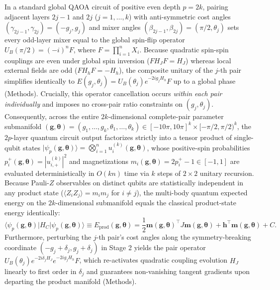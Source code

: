 \documentclass[10pt,a4paper]{article}
\begin{document}
In a standard global QAOA circuit of positive even depth $p = 2k$, pairing adjacent layers $2j-1$ and $2j$ ($j = 1, \ldots, k$) with anti-symmetric cost angles $(\gamma_{2j-1}, \gamma_{2j}) = (-g_j, g_j)$ and mixer angles $(\beta_{2j-1}, \beta_{2j}) = (\pi/2, \theta_j)$ sets every odd-layer mixer equal to the global spin-flip operator $U_B(\pi/2) = (-i)^n F$, where $F = \prod_{i=1}^n X_i$. Because quadratic spin-spin couplings are even under global spin inversion ($F H_J F = H_J$) whereas local external fields are odd ($F H_h F = -H_h$), the composite unitary of the $j$-th pair simplifies identically to $E(g_j, \theta_j) = U_B(\theta_j) e^{-2i g_j H_h} F$ up to a global phase \citep{yao2026echo} (Methods). Crucially, this operator cancellation occurs \emph{within each pair individually} and imposes no cross-pair ratio constraints on $(g_j, \theta_j)$. Consequently, across the entire $2k$-dimensional complete-pair parameter submanifold $(\boldsymbol{g}, \boldsymbol{\theta}) = (g_1, \ldots, g_k, \theta_1, \ldots, \theta_k) \in [-10\pi, 10\pi]^k \times [-\pi/2, \pi/2)^k$, the $2p$-layer quantum circuit output factorizes strictly into a tensor product of single-qubit states $|\psi_p(\boldsymbol{g}, \boldsymbol{\theta})\rangle = \bigotimes_{i=1}^n u_i^{(k)}(\boldsymbol{g}, \boldsymbol{\theta})$, whose positive-spin probabilities $p_i^+(\boldsymbol{g}, \boldsymbol{\theta}) = |u_{i,+}^{(k)}|^2$ and magnetizations $m_i(\boldsymbol{g}, \boldsymbol{\theta}) = 2p_i^+ - 1 \in [-1, 1]$ are evaluated deterministically in $O(kn)$ time via $k$ steps of $2\times 2$ unitary recursion. Because Pauli-$Z$ observables on distinct qubits are statistically independent in any product state ($\langle Z_i Z_j \rangle = m_i m_j$ for $i \ne j$), the multi-body quantum expected energy on the $2k$-dimensional submanifold equals the classical product-state energy identically:
\[
\langle\psi_p(\boldsymbol{g},\boldsymbol{\theta})|H_C|\psi_p(\boldsymbol{g},\boldsymbol{\theta})\rangle \equiv E_{\mathrm{prod}}(\boldsymbol{g},\boldsymbol{\theta}) = \frac{1}{2}\boldsymbol{m}(\boldsymbol{g},\boldsymbol{\theta})^\top J\boldsymbol{m}(\boldsymbol{g},\boldsymbol{\theta}) + \boldsymbol{h}^\top\boldsymbol{m}(\boldsymbol{g},\boldsymbol{\theta}) + C.
\]
Furthermore, perturbing the $j$-th pair's cost angles along the symmetry-breaking coordinate $(-g_j + \delta_j, g_j + \delta_j)$ in Stage 2 yields the pair operator $U_B(\theta_j) e^{-2i\delta_j H_J} e^{-2i g_j H_h} F$, which re-activates quadratic coupling evolution $H_J$ linearly to first order in $\delta_j$ and guarantees non-vanishing tangent gradients upon departing the product manifold (Methods).
\end{document}
